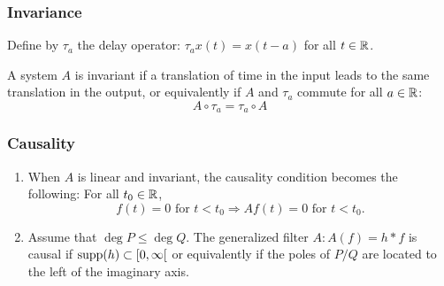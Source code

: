 \begin{frame}
\frametitle{Invariance}
Define by $\tau_a$ the \alert{delay operator}: $\tau_a x(t)= x(t-a)$ for all $t \in \mathbb{R}$.
\begin{definition}
A system $A$ is \alert{invariant} if a translation of time in the input leads to the same translation in the output, or equivalently
if $A$ and $\tau_a$ commute for all $a \in \mathbb{R}$:
\[
A \circ \tau_a = \tau_a \circ A
\]
\end{definition}
\end{frame}

\begin{frame}
\frametitle{Causality}
\begin{enumerate}[label=(\roman*)]
\item When $A$ is  linear and invariant, the causality condition becomes the following:
For all $t_{0}\in \mathbb{R}$,
$$
\text{$f(t)=0$ for $t<t_{0}\Rightarrow Af(t)=0$ for $t<t_{0}$.}
$$
\item Assume that $\deg P\leq\deg Q$. The generalized filter $A: A(f)= h * f$ is \alert{causal} if $\mathrm{supp}(h) \subset \left[0,\infty\right[$ or equivalently if the poles of $P/Q$ are located to the \alert{left of the imaginary axis}.
\end{enumerate}
\end{frame}


 